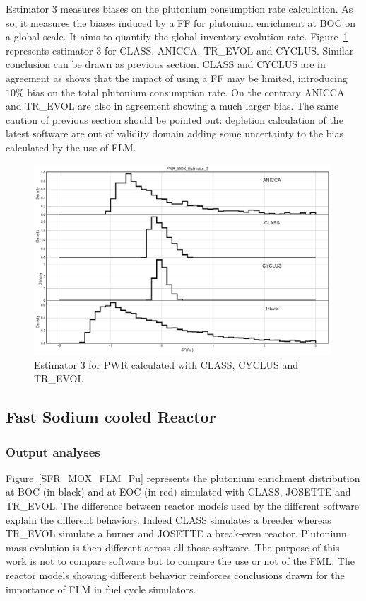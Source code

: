 Estimator 3 measures biases on the plutonium consumption rate calculation. As
so, it measures the biases induced by a \gls{FF} for plutonium enrichment at
\gls{BOC} on a global scale. It aims to quantify the global inventory evolution
rate.  Figure~\ref{fig:Est3_PWR} represents estimator 3 for CLASS, ANICCA,
TR\_EVOL and CYCLUS. Similar conclusion can be drawn as previous section. CLASS
and CYCLUS are in agreement as shows that the impact of using a \gls{FF} may be
limited, introducing $10\%$ bias on the total plutonium consumption rate. On the
contrary ANICCA and TR\_EVOL are also in agreement showing a much larger bias.
The same caution of previous section should be pointed out: depletion
calculation of the latest software are out of validity domain adding some
uncertainty to the bias calculated by the use of \gls{FLM}.       

\begin{figure}[h]
	\begin{center}
		\includegraphics[width = 0.99\textwidth]{../../Feature_1/RAW_DATA/FIG/PWR_MOX_Estimator_3.pdf}
		\caption{Estimator 3 for \gls{PWR} calculated with CLASS, CYCLUS and TR\_EVOL}
		\label{fig:Est3_PWR}
	\end{center}
\end{figure}

\subsection{Fast Sodium cooled Reactor}
\subsubsection{Output analyses}

Figure~\ref{SFR_MOX_FLM_Pu} represents the plutonium enrichment distribution at
BOC (in black) and at \gls{EOC} (in red) simulated with CLASS, JOSETTE and TR\_EVOL.
The difference between reactor models used by the different software explain the
different behaviors. Indeed CLASS simulates a breeder whereas TR\_EVOL simulate a
burner and JOSETTE a break-even reactor. Plutonium mass evolution is then
different across all those software. The purpose of this work is not to compare
software but to compare the use or not of the \gls{FML}. The reactor models
showing different behavior reinforces conclusions drawn for the importance of
\gls{FLM} in fuel cycle simulators.     

